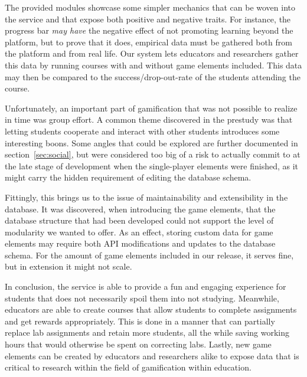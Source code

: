 The provided modules showcase some simpler mechanics that can be woven into the service and that expose both positive and negative traits. For instance, the progress bar \emph{may have} the negative effect of not promoting learning beyond the platform, but to prove that it does, empirical data must be gathered both from the platform and from real life. Our system lets educators and researchers gather this data by running courses with and without game elements included. This data may then be compared to the success/drop-out-rate of the students attending the course.

Unfortunately, an important part of gamification that was not possible to realize in time was group effort. A common theme discovered in the prestudy was that letting students cooperate and interact with other students introduces some interesting boons. Some angles that could be explored are further documented in section~\ref{sec:social}, but were considered too big of a risk to actually commit to at the late stage of development when the single-player elements were finished, as it might carry the hidden requirement of editing the database schema.

Fittingly, this brings us to the issue of maintainability and extensibility in the database. It was discovered, when introducing the game elements, that the database structure that had been developed could not support the level of modularity we wanted to offer. As an effect, storing custom data for game elements may require both API modifications and updates to the database schema. For the amount of game elements included in our release, it serves fine, but in extension it might not scale.

In conclusion, the service is able to provide a fun and engaging experience for students that does not necessarily spoil them into not studying. Meanwhile, educators are able to create courses that allow students to complete assignments and get rewards appropriately. This is done in a manner that can partially replace lab assignments and retain more students, all the while saving working hours that would otherwise be spent on correcting labs. Lastly, new game elements can be created by educators and researchers alike to expose data that is critical to research within the field of gamification within education.




